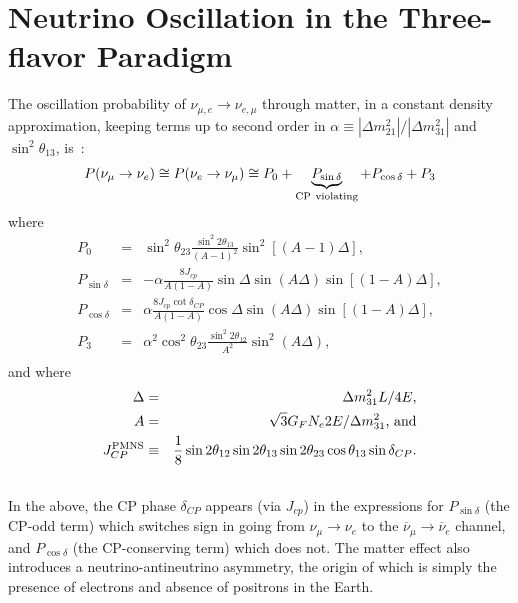 \documentclass[letterpaper,11pt]{article}
\newcommand{\dcp}{\mbox{$\delta_{CP}$}}
\begin{document}
\section{Neutrino Oscillation in the Three-flavor Paradigm}
\label{sect:nuosc}
The oscillation probability of $\nu_{\mu,e}
\rightarrow \nu_{e,\mu}$ through matter, in a constant density
approximation, keeping terms up to second order in
$\alpha \equiv
|\Delta m_{21}^2|/|\Delta m_{31}^2|$ and $\sin ^2 \theta_{13}$,
is~\cite{Freund:2001pn,Beringer:1900zz}:
%
\begin{equation}
P(\nu_\mu \rightarrow \nu_e) \cong  P(\nu_e \rightarrow \nu_\mu) \cong 
P_0 + \underbrace{P_{\sin \delta}}_{\rm CP \ violating} + P_{\cos \delta} + P_3
\label{eqn:papprox0}
\end{equation}
where
\begin{eqnarray}
P_0 &=& \sin^2 \theta_{23} \frac{\sin^2 2 \theta_{13}}{(A-1)^2}\sin^2[(A-1)\Delta], \label{eqn:papprox1}\\
P_{\sin \delta} &=& -\alpha \frac{8 J_{cp}}{A(1-A)} \sin \Delta \sin(A \Delta) \sin [(1-A)\Delta],  \label{eqn:papprox3}\\
P_{\cos \delta} &=& \alpha \frac{8 J_{cp} \cot \dcp}{A(1-A)} \cos
\Delta \sin(A \Delta) \sin [(1-A)\Delta], \label{eqn:papprox4} \\
P_3 &=& \alpha^2 \cos^2 \theta_{23} \frac{\sin^2 2 \theta_{12}}{A^2}\sin^2 (A \Delta), \label{eqn:papprox2} \\
\end{eqnarray}
%
and where 
\begin{eqnarray}
\Delta & = & \Delta m^2_{31} L/4E, \\  
A & = & \sqrt{3} G_F N_e 2E/\Delta m^2_{31} \textrm{, and} \\
J_{CP}^{\rm PMNS} & \equiv &\frac{1}{8} \sin 2 \theta_{12} \sin 2 \theta_{13} \sin 2 \theta_{23} \cos \theta_{13} \sin \delta_{CP}. \\ \nonumber
\end{eqnarray}
%
In the above, the CP phase $\dcp$ appears (via $J_{cp}$)
in the expressions for $P_{\sin\delta}$ (the CP-odd term) which 
switches sign in going from 
$\nu_\mu \to \nu_e$ to the $\overline{\nu}_\mu \to \overline{\nu}_e$ channel, 
and $P_{\cos\delta}$ (the CP-conserving term) which does not.  
The matter effect 
also introduces a neutrino-antineutrino asymmetry, the origin of which 
is simply the presence of electrons and absence of positrons in the Earth.  
\end{document}
